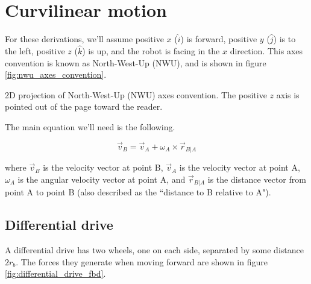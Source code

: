 \section{Curvilinear motion}

For these derivations, we'll assume positive $x$ ($\hat{i}$) is forward,
positive $y$ ($\hat{j}$) is to the left, positive $z$ ($\hat{k}$) is up, and
the robot is facing in the $x$ direction. This axes convention is known as
North-West-Up (NWU), and is shown in figure \ref{fig:nwu_axes_convention}.

\begin{bookfigure}

  \caption{2D projection of North-West-Up (NWU) axes convention. The positive
    $z$ axis is pointed out of the page toward the reader.}
  \label{fig:nwu_axes_convention}
\end{bookfigure}

The main equation we'll need is the following.

\begin{equation*}
  \vec{v}_B = \vec{v}_A + \omega_A \times \vec{r}_{B|A}
\end{equation*}

where $\vec{v}_B$ is the velocity vector at point B, $\vec{v}_A$ is the velocity
vector at point A, $\omega_A$ is the angular velocity vector at point A, and
$\vec{r}_{B|A}$ is the distance vector from point A to point B (also described
as the ``distance to B relative to A").

\subsection{Differential drive}

A differential drive has two wheels, one on each side, separated by some
distance $2r_b$. The forces they generate when moving forward are shown in
figure \ref{fig:differential_drive_fbd}.

